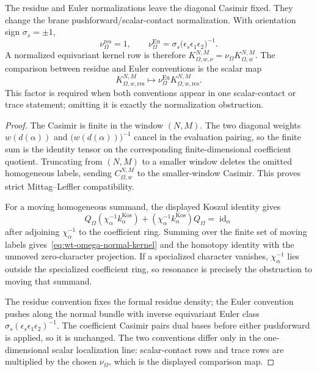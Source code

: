 \begin{thm}
  The residue and Euler normalizations leave the diagonal Casimir fixed.
  They change the brane pushforward/scalar-contact normalization.  With
  orientation sign \(\sigma_s=\pm1\),
  \[
    \nu_\Omega^{\mathrm{res}}=1,\qquad
    \nu_\Omega^{\mathrm{Eu}}
      =
    \sigma_s\bigl(\epsilon_s\epsilon_1\epsilon_2\bigr)^{-1}.
  \]
  A normalized equivariant kernel row is therefore
  \(K_{\Omega,w,\nu}^{N,M}=\nu_\Omega K_{\Omega,w}^{N,M}\).  The comparison
  between residue and Euler conventions is the scalar map
  \[
    K_{\Omega,w,\mathrm{res}}^{N,M}
      \longmapsto
    \nu_\Omega^{\mathrm{Eu}}K_{\Omega,w,\mathrm{res}}^{N,M}.
  \]
  This factor is required when both conventions appear in one
  scalar-contact or trace statement; omitting it is exactly the
  normalization obstruction.
\end{thm}

\begin{proof}
  The Casimir is finite in the window \((N,M)\).  The two diagonal weights
  \(w(d(\alpha))\) and \(\bigl(w(d(\alpha))\bigr)^{-1}\) cancel in the
  evaluation pairing, so the finite sum is the identity tensor on the
  corresponding finite-dimensional coefficient quotient.  Truncating from
  \((N,M)\) to a smaller window deletes the omitted homogeneous
  labels, sending \(C_{\Omega,w}^{N,M}\) to the smaller-window Casimir.
  This proves strict Mittag--Leffler compatibility.

  For a moving homogeneous summand, the displayed Koszul identity gives
  \[
    Q_\Omega(\chi_\alpha^{-1}k^{\mathrm{Kos}}_\alpha)
      +(\chi_\alpha^{-1}k^{\mathrm{Kos}}_\alpha)Q_\Omega
      =
    \operatorname{id}_\alpha
  \]
  after adjoining \(\chi_\alpha^{-1}\) to the coefficient ring.  Summing
  over the finite set of moving labels gives~\eqref{eq:wt-omega-normal-kernel}
  and the homotopy identity with the
  unmoved zero-character projection.  If a specialized character vanishes,
  \(\chi_\alpha^{-1}\) lies outside the specialized coefficient ring, so
  resonance is precisely the obstruction to moving that summand.

  The residue convention fixes the formal residue density; the Euler
  convention pushes along the
  normal bundle with inverse equivariant Euler class
  \(\sigma_s(\epsilon_s\epsilon_1\epsilon_2)^{-1}\). The coefficient
  Casimir pairs dual bases before either pushforward is applied, so it is
  unchanged. The two conventions differ only in the one-dimensional
  scalar localization line: scalar-contact rows and trace rows are
  multiplied by the chosen \(\nu_\Omega\), which is the displayed
  comparison map.
\end{proof}

